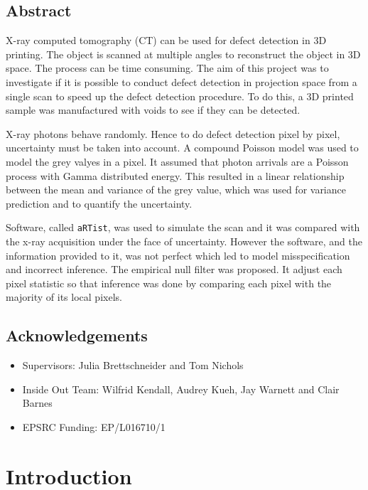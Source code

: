 \documentclass[12pt, a4paper]{memoir}
\begin{document}
\sloppy



\frontmatter
\section*{Abstract}
X-ray computed tomography (CT) can be used for defect detection in 3D printing. The object is scanned at multiple angles to reconstruct the object in 3D space. The process can be time consuming. The aim of this project was to investigate if it is possible to conduct defect detection in projection space from a single scan to speed up the defect detection procedure. To do this, a 3D printed sample was manufactured with voids to see if they can be detected.

X-ray photons behave randomly. Hence to do defect detection pixel by pixel, uncertainty must be taken into account. A compound Poisson model was used to model the grey valyes in a pixel. It assumed that photon arrivals are a Poisson process with Gamma distributed energy. This resulted in a linear relationship between the mean and variance of the grey value, which was used for variance prediction and to quantify the uncertainty.

Software, called \texttt{aRTist}, was used to simulate the scan and it was compared with the x-ray acquisition under the face of uncertainty. However the software, and the information provided to it, was not perfect which led to model misspecification and incorrect inference. The empirical null filter was proposed. It adjust each pixel statistic so that inference was done by comparing each pixel with the majority of its local pixels.

\newpage

\section*{Acknowledgements}
\begin{itemize}
	\item Supervisors: Julia Brettschneider and Tom Nichols
	\item Inside Out Team: Wilfrid Kendall, Audrey Kueh, Jay Warnett and Clair Barnes
	\item EPSRC Funding: EP/L016710/1
\end{itemize}

\newpage
\tableofcontents*

\mainmatter

\chapter{Introduction}
\end{document}
